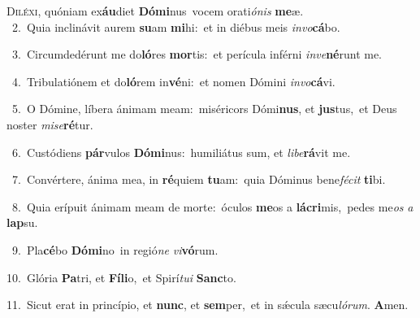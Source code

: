 \lettrine{\initial\textcolor{\initialcolor}{D}}{iléxi,} quóniam ex\-\textbf{áu}\-diet \textbf{Dó}\-\textbf{mi}nus~\star vocem orati\-\textit{ó}\-\textit{nis} \textbf{me}\-æ.\\
{\numbfont\textcolor{\numbcolor}{~2.}}~Quia inclinávit aurem \textbf{su}\-am \textbf{mi}\-hi:~\star et in diébus meis \textit{in}\-\textit{vo}\textbf{cá}bo.\par
{\numbfont\textcolor{\numbcolor}{~3.}}~Circumdedérunt me do\-\textbf{ló}\-res \textbf{mor}\-tis:~\star et perícula inférni \textit{in}\-\textit{ve}\textbf{né}runt me.\par
{\numbfont\textcolor{\numbcolor}{~4.}}~Tribulatiónem et do\-\textbf{ló}\-rem in\-\textbf{vé}\-ni:~\star et nomen Dómini \textit{in}\-\textit{vo}\textbf{cá}vi.\par
{\numbfont\textcolor{\numbcolor}{~5.}}~O Dómine, líbera ánimam meam:~\dagger miséricors Dómi\-\textbf{nus}\-, et \textbf{jus}\-tus,~\star et Deus noster \textit{mi}\-\textit{se}\textbf{ré}tur.\par
{\numbfont\textcolor{\numbcolor}{~6.}}~Custódiens \textbf{pár}\-vulos \textbf{Dó}\-\textbf{mi}nus:~\star humiliátus sum, et \textit{li}\-\textit{be}\textbf{rá}vit me.\par
{\numbfont\textcolor{\numbcolor}{~7.}}~Convértere, ánima mea, in \textbf{ré}\-quiem \textbf{tu}\-am:~\star quia Dóminus bene\-\textit{fé}\-\textit{cit} \textbf{ti}\-bi.\par
{\numbfont\textcolor{\numbcolor}{~8.}}~Quia erípuit ánimam meam de morte:~\dagger óculos \textbf{me}\-os a \textbf{lá}\-\textbf{cri}mis,~\star pedes me\textit{os} \textit{a} \textbf{lap}\-su.\par
{\numbfont\textcolor{\numbcolor}{~9.}}~Pla\-\textbf{cé}\-bo \textbf{Dó}\-\textbf{mi}no~\star in regió\textit{ne} \textit{vi}\-\textbf{vó}rum.\par
{\numbfont\textcolor{\numbcolor}{10.}}~Glória \textbf{Pa}\-tri, et \textbf{Fí}\-\textbf{li}o,~\star et Spirí\-\textit{tu}\-\textit{i} \textbf{Sanc}\-to.\par
{\numbfont\textcolor{\numbcolor}{11.}}~Sicut erat in princípio, et \textbf{nunc}\-, et \textbf{sem}\-per,~\star et in sǽcula sæcu\-\textit{ló}\-\textit{rum}. \textbf{A}\-men.\par
